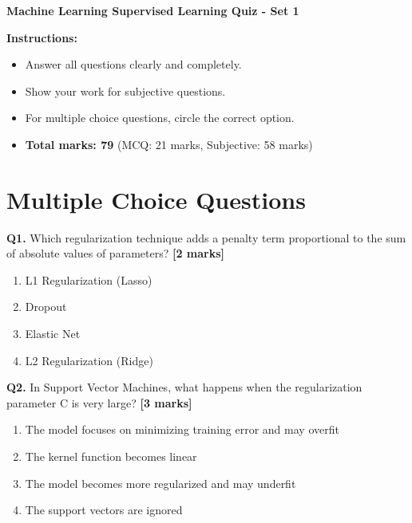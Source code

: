 \documentclass{article}
\begin{document}
\begin{center}
{\Large \textbf{Machine Learning Supervised Learning Quiz - Set 1}}
\end{center}

\vspace{0.5cm}

\textbf{Instructions:}
\begin{itemize}
\item Answer all questions clearly and completely.
\item Show your work for subjective questions.
\item For multiple choice questions, circle the correct option.
\item \textbf{Total marks: 79} (MCQ: 21 marks, Subjective: 58 marks)
\end{itemize}

\vspace{0.5cm}


\section*{Multiple Choice Questions}

\textbf{Q1.} Which regularization technique adds a penalty term proportional to the sum of absolute values of parameters? \textbf{[2 marks]}

\begin{enumerate}[label=(\Alph*)]

  \item L1 Regularization (Lasso)

  \item Dropout

  \item Elastic Net

  \item L2 Regularization (Ridge)

\end{enumerate}

\vspace{0.3cm}

\textbf{Q2.} In Support Vector Machines, what happens when the regularization parameter C is very large? \textbf{[3 marks]}

\begin{enumerate}[label=(\Alph*)]

  \item The model focuses on minimizing training error and may overfit

  \item The kernel function becomes linear

  \item The model becomes more regularized and may underfit

  \item The support vectors are ignored

\end{enumerate}
\end{document}
